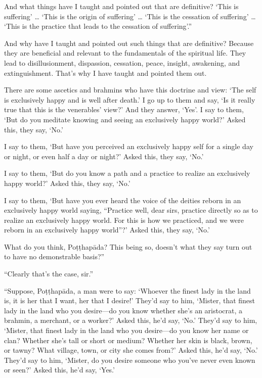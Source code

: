 \documentclass[12pt,openany]{book}%
\begin{document}
And what things have I taught and pointed out that are definitive? ‘This is suffering’ … ‘This is the origin of suffering’ … ‘This is the cessation of suffering’ … ‘This is the practice that leads to the cessation of suffering’.” 

And why have I taught and pointed out such things that are definitive? Because they are beneficial and relevant to the fundamentals of the spiritual life. They lead to disillusionment, dispassion, cessation, peace, insight, awakening, and extinguishment. That’s why I have taught and pointed them out. 

There are some ascetics and brahmins who have this doctrine and view: ‘The self is exclusively happy and is well after death.’ I go up to them and say, ‘Is it really true that this is the venerables’ view?’ And they answer, ‘Yes’. I say to them, ‘But do you meditate knowing and seeing an exclusively happy world?’ Asked this, they say, ‘No.’ 

I say to them, ‘But have you perceived an exclusively happy self for a single day or night, or even half a day or night?’ Asked this, they say, ‘No.’ 

I say to them, ‘But do you know a path and a practice to realize an exclusively happy world?’ Asked this, they say, ‘No.’ 

I say to them, ‘But have you ever heard the voice of the deities reborn in an exclusively happy world saying, “Practice well, dear sirs, practice directly so as to realize an exclusively happy world. For this is how we practiced, and we were reborn in an exclusively happy world”?’ Asked this, they say, ‘No.’ 

What do you think, \textsanskrit{Poṭṭhapāda}? This being so, doesn’t what they say turn out to have no demonstrable basis?” 

“Clearly that’s the case, sir.” 

“Suppose, \textsanskrit{Poṭṭhapāda}, a man were to say: ‘Whoever the finest lady in the land is, it is her that I want, her that I desire!’ They’d say to him, ‘Mister, that finest lady in the land who you desire—do you know whether she’s an aristocrat, a brahmin, a merchant, or a worker?’ Asked this, he’d say, ‘No.’ They’d say to him, ‘Mister, that finest lady in the land who you desire—do you know her name or clan? Whether she’s tall or short or medium? Whether her skin is black, brown, or tawny? What village, town, or city she comes from?’ Asked this, he’d say, ‘No.’ They’d say to him, ‘Mister, do you desire someone who you’ve never even known or seen?’ Asked this, he’d say, ‘Yes.’ 
\end{document}
